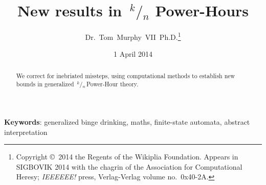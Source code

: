 \documentclass[twocolumn]{article}
\newcommand\sfrac[2]{\!{}\,^{#1}\!/{}\!_{#2}}
\begin{document}
 

\title{New results in $\sfrac{k}{n}$ Power-Hours}
\author{Dr.~Tom~Murphy~VII~Ph.D.\thanks{
Copyright \copyright\ 2014 the Regents of the Wikiplia
Foundation. Appears in SIGBOVIK 2014 with the chagrin of the
Association for Computational Heresy; {\em IEEEEEE!} press,
Verlag-Verlag volume no.~0x40-2A.
}
}

\renewcommand\th{\ensuremath{{}^{\textrm{th}}}}
\newcommand\st{\ensuremath{{}^{\textrm{st}}}}
\newcommand\rd{\ensuremath{{}^{\textrm{rd}}}}
\newcommand\nd{\ensuremath{{}^{\textrm{nd}}}}
\newcommand\at{\ensuremath{\scriptstyle @}}

\renewcommand\>{$>$}
\newcommand\<{$<$}
\newcommand\kn{\ensuremath{\sfrac{k}{n}\,}}
\newcommand\bmsl{BM$s$L}

\newcommand\any{\ensuremath{\textrm{?}}}
\newcommand\nocup{\text{\sout{\ensuremath{\cup}}}}
\newcommand\fullcup{\ensuremath{\uplus}}
\newcommand\emptycup{\ensuremath{\cup}}
\newcommand\overcup{\ensuremath{\cap}}
\newcommand\scup[1]{\ensuremath{\cup\!\!\!{}^{{}_{#1}}}}

\newcommand\nodrink{\ensuremath{\Rightarrow}}
\newcommand\drink{\ensuremath{\stackrel{{}^{\textrm{+}}}{\Rightarrow}}}
\newcommand\qdrink{\ensuremath{\stackrel{{}^{\textrm{?}}}{\Rightarrow}}}

\date{1 April 2014}

\maketitle

\begin{abstract}
We correct for inebriated missteps, using computational methods to
establish new bounds in generalized \kn Power-Hour theory.
\end{abstract}

\vspace{1em}
{\noindent \small {\bf Keywords}:
  generalized binge drinking, maths,
  finite-state automata,
  abstract interpretation
}
\end{document}
